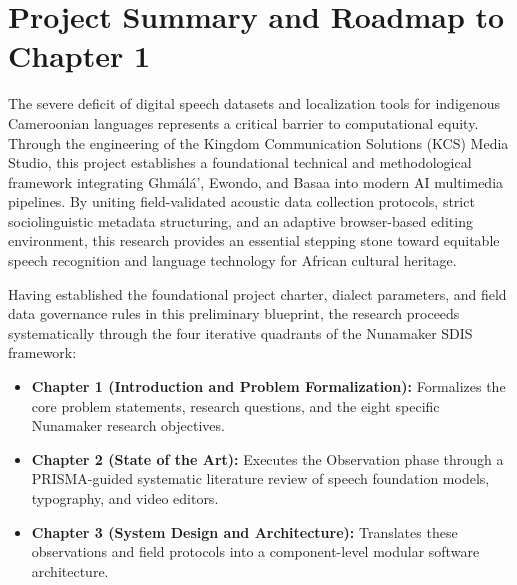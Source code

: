 \documentclass[a4paper,11pt]{article}
\begin{document}
\section{Project Summary and Roadmap to Chapter 1}
\label{sec:chap0_roadmap}

The severe deficit of digital speech datasets and localization tools for indigenous Cameroonian languages represents a critical barrier to computational equity. Through the engineering of the Kingdom Communication Solutions (KCS) Media Studio, this project establishes a foundational technical and methodological framework integrating Gh\textopeno m\'al\'a', Ewondo, and Basaa into modern AI multimedia pipelines. By uniting field-validated acoustic data collection protocols, strict sociolinguistic metadata structuring, and an adaptive browser-based editing environment, this research provides an essential stepping stone toward equitable speech recognition and language technology for African cultural heritage.

Having established the foundational project charter, dialect parameters, and field data governance rules in this preliminary blueprint, the research proceeds systematically through the four iterative quadrants of the Nunamaker SDIS framework:
\begin{itemize}
    \item \textbf{Chapter 1 (Introduction and Problem Formalization):} Formalizes the core problem statements, research questions, and the eight specific Nunamaker research objectives.
    \item \textbf{Chapter 2 (State of the Art):} Executes the Observation phase through a PRISMA-guided systematic literature review of speech foundation models, typography, and video editors.
    \item \textbf{Chapter 3 (System Design and Architecture):} Translates these observations and field protocols into a component-level modular software architecture.
\end{itemize}

\newpage
\appendix
\nocite{*}
\printbibliography[heading=bibintoc]
\end{document}

